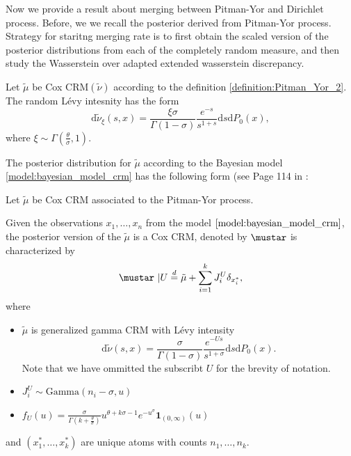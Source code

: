 
Now we provide a result about merging between Pitman-Yor and Dirichlet process. Before, we we recall the posterior derived from Pitman-Yor process. Strategy for staritng merging rate is to first obtain the scaled version of the posterior distributions from each of the completely random measure, and then study the Wasserstein over adapted extended wasserstein discrepancy.

Let $\tilde{\mu}$ be Cox $\mathrm{CRM}(\tilde{\nu})$ according to the definition \ref{definition:Pitman_Yor_2}. The random L\'evy intesnity has the form
\[
\mathrm{d}\tilde{\nu}_\xi(s,x) = \frac{\xi \sigma}{\Gamma(1-\sigma)}\frac{e^{-s}}{s^{1+s}}\mathrm{d}s\mathrm{d}P_0(x),
\]
where $\xi \sim \Gamma\left(\frac{\theta}{\sigma}, 1 \right)$.

The posterior distribution for $\tilde{\mu}$ according to the Bayesian model \ref{model:bayesian_model_crm} has the following form (see Page 114 in \cite{hjort2010bayesian}:


Let $\tilde{\mu}$ be Cox CRM associated to the Pitman-Yor process. 

Given the observations $x_1,\dots, x_n$  from the model $\ref{model:bayesian_model_crm}$, the posterior version of the $\tilde{\mu}$ is a Cox CRM, denoted by $\mustar$ is characterized by  
\[
\mustar\ | U \overset{d}{=} \tilde{\mu} + \sum_{i = 1}^k J_i^U \delta_{x_i^*},
\]
where
\begin{itemize}
    \item $\tilde{\mu}$ is generalized gamma CRM with L\'evy intensity
    \[
    \mathrm{d}\tilde{\nu}(s,x) = \frac{ \sigma}{\Gamma(1 - \sigma)} \frac{e^{-Us}}{s^{1+\sigma}} \mathrm{d}s \mathrm{d}P_0(x).
    \]
    Note that we have ommitted the subscribt $U$ for the brevity of notation.
    \item $J_i^U \sim \mathrm{Gamma}(n_i - \sigma, u)$
    \item $f_U(u) =\frac{\sigma}{\Gamma\left(k+\frac{\theta}{\sigma}\right)} u^{\theta + k\sigma - 1}e^{-u^\sigma}\mathbf{1}_{(0,\infty)}(u)$
\end{itemize}
and $\left(x_1^*,\dots, x_k^*\right)$ are unique atoms with counts $n_1,\dots, n_k.$

